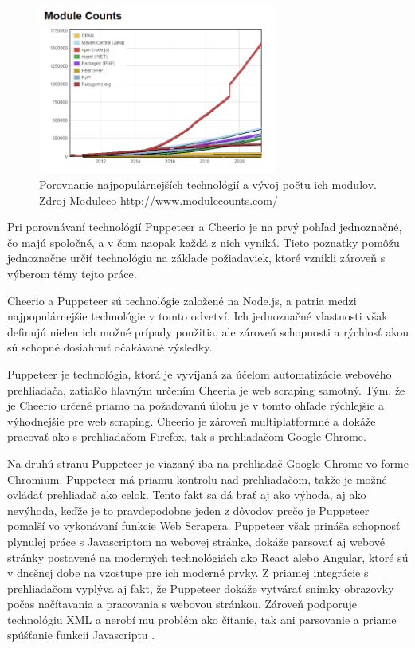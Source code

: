 \begin{figure}[hbt]
	\centering
	\includegraphics[width=0.7\textwidth]{obrazky-figures/modules.png}
	\caption{Porovnanie najpopulárnejších technológií a vývoj počtu ich modulov. Zdroj Moduleco \url{http://www.modulecounts.com/}}
	\label{Moduleco_img}
\end{figure}

\bigskip

Pri porovnávaní technológií Puppeteer a Cheerio je na prvý pohľad jednoznačné, čo majú spoločné, a v čom naopak každá z nich vyniká. Tieto poznatky pomôžu jednoznačne určiť technológiu na základe požiadaviek, ktoré vznikli zároveň s výberom témy tejto práce.

Cheerio a Puppeteer sú technológie založené na Node.js, a patria medzi najpopulárnejšie technológie v tomto odvetví. Ich jednoznačné vlastnosti však definujú nielen ich možné prípady použitia, ale zároveň schopnosti a rýchlosť akou sú schopné dosiahnuť očakávané výsledky. 

\newpage

Puppeteer je technológia, ktorá je vyvíjaná za účelom automatizácie webového prehliadača, zatiaľčo hlavným určením Cheeria je web scraping samotný. Tým, že je Cheerio určené priamo na požadovanú úlohu je v tomto ohľade rýchlejšie a výhodnejšie pre web scraping. Cheerio je zároveň multiplatformné a dokáže pracovať ako s prehliadačom Firefox, tak s prehliadačom Google Chrome. 

Na druhú stranu Puppeteer je viazaný iba na prehliadač Google Chrome vo forme Chromium. Puppeteer má priamu kontrolu nad prehliadačom, takže je možné ovládať prehliadač ako celok. Tento fakt sa dá brať aj ako výhoda, aj ako nevýhoda, keďže je to pravdepodobne jeden z dôvodov prečo je Puppeteer pomalší vo vykonávaní funkcie Web Scrapera. Puppeteer však prináša schopnosť plynulej práce s Javascriptom na webovej stránke, dokáže parsovať aj webové stránky postavené na moderných technológiách ako React alebo Angular, ktoré sú v dnešnej dobe na vzostupe pre ich moderné prvky. Z priamej integrácie s prehliadačom vyplýva aj fakt, že Puppeteer dokáže vytvárať snímky obrazovky počas načítavania a pracovania s webovou stránkou. Zároveň podporuje technológiu XML a nerobí mu problém ako čítanie, tak ani parsovanie a priame spúšťanie funkcií Javascriptu \cite{Differences}. 

